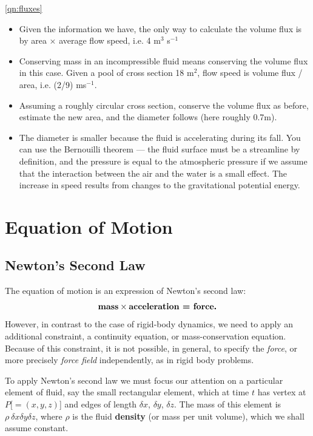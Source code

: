 \documentclass[10pt]{report}
\begin{document}
\begin{answer1}
\begin{questionnumber}{\ref{qn:fluxes}}
	\begin{itemize}
		 \item Given the information we have, the only way to calculate the volume flux is by area
		       $\times$ average flow speed, i.e. 4 m$^{3}$ s$^{-1}$
		 \item Conserving mass in an incompressible fluid means conserving the volume flux in this case.
		       Given a pool of cross section 18 m$^{2}$, flow speed is volume flux / area, i.e. (2/9) ms$^{-1}$.
		 \item Assuming a roughly circular cross section, conserve the volume flux as before,
		        estimate the new area, and the diameter follows (here roughly 0.7m).
		 \item The diameter is smaller because the fluid is accelerating during its fall.
		       You can use the Bernouilli theorem --- the fluid surface must be a streamline by definition,
		       and the pressure is equal to the atmospheric pressure if we assume that the interaction between
		       the air and the water is a small effect. The increase in speed results from changes
		       to the gravitational potential energy.
	 \end{itemize}
\end{questionnumber}




\end{answer1}


\cleardoublepage

\chapter{Equation of Motion}
\section{Newton's Second Law}
The equation of motion is an expression of Newton's second law:
\[
\hbox{\textbf{mass}}\times \hbox{\textbf{acceleration = force.}}
\]
However, in contrast to the case of rigid-body dynamics, we need to apply an
additional constraint, a continuity equation, or mass-conservation equation.
Because of this constraint, it is not possible, in general, to specify the
\textit{force}, or more precisely \textit{force field} independently, as in rigid body problems.

To apply Newton's second law we must focus our attention on a particular
element of fluid, say the small rectangular element, which at time $t$ has
vertex at $P [=(x,y,z)$] and edges of length $\delta x$, $\delta y$, $\delta
z$. The mass of this element is $\rho\ \delta x \delta y\delta z$,
where $\rho $ is the fluid \textbf{density} (or mass per unit volume), which
we shall assume constant.
\end{document}
